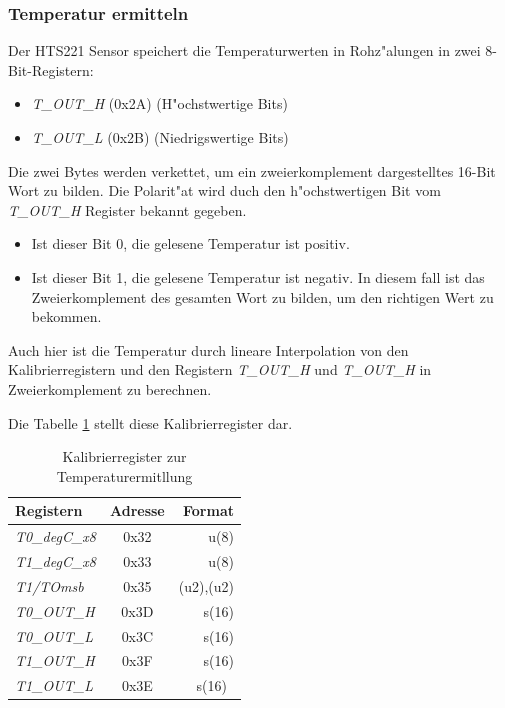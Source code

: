 \vspace{10cm}
\subsubsection{Temperatur ermitteln}
Der HTS221 Sensor speichert die Temperaturwerten in Rohz"alungen in 
zwei 8-Bit-Registern:

\begin{itemize}
	\item \textit{T\_OUT\_H} (0x2A) (H"ochstwertige Bits)
	\item \textit{T\_OUT\_L} (0x2B) (Niedrigswertige Bits)
\end{itemize}

Die zwei Bytes werden verkettet, um ein zweierkomplement dargestelltes 
16-Bit Wort zu bilden. Die Polarit"at wird duch den h"ochstwertigen Bit 
vom \textit{T\_OUT\_H} Register bekannt gegeben.

\begin{itemize}
	\item Ist dieser Bit 0, die gelesene Temperatur ist positiv.
	\item Ist dieser Bit 1, die gelesene Temperatur ist negativ. In 
	diesem fall ist das Zweierkomplement des gesamten Wort zu bilden, 
	um den richtigen Wert zu bekommen.
\end{itemize}

Auch hier ist die Temperatur durch lineare Interpolation von den 
Kalibrierregistern und den Registern \textit{T\_OUT\_H} und 
\textit{T\_OUT\_H} in Zweierkomplement zu berechnen.

Die Tabelle \ref{tab:Reg_T} stellt diese Kalibrierregister dar.

\begin{center}
	\begin{table}[htbp] 
		\centering 
		\Large
		\begin{tabular}{l|c|r}
			\textbf{Registern} & \textbf{Adresse} & \textbf{Format} \\
			\hline
			\textit{T0\_degC\_x8} & 0x32	& u(8) \\
			\hline
			\textit{T1\_degC\_x8} & 0x33	& u(8)\\
			\hline
			\textit{T1/TOmsb} & 0x35	& (u2),(u2)\\
			\hline
			\textit{T0\_OUT\_H} 	& 0x3D  & s(16)\\
			\hline
			\textit{T0\_OUT\_L} 	& 0x3C  & s(16)\\
			\hline
			\textit{T1\_OUT\_H}	& 0x3F	& s(16)\\
			\hline
			\textit{T1\_OUT\_L} 	& 0x3E  & s(16)\
		\end{tabular} 
		\caption{Kalibrierregister zur Temperaturermitllung} 
		\label{tab:Reg_T} 
		
	\end{table}
\end{center}

